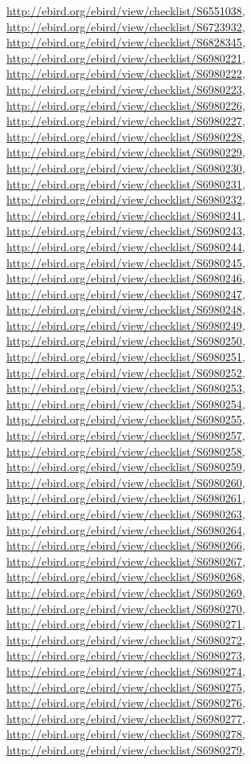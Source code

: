 \documentclass[9pt, article]{memoir}
\begin{document}
\begin{multicols}{2}
\url{http://ebird.org/ebird/view/checklist/S6551038}, 
\url{http://ebird.org/ebird/view/checklist/S6723932}, 
\url{http://ebird.org/ebird/view/checklist/S6828345}, 
\url{http://ebird.org/ebird/view/checklist/S6980221}, 
\url{http://ebird.org/ebird/view/checklist/S6980222}, 
\url{http://ebird.org/ebird/view/checklist/S6980223}, 
\url{http://ebird.org/ebird/view/checklist/S6980226}, 
\url{http://ebird.org/ebird/view/checklist/S6980227}, 
\url{http://ebird.org/ebird/view/checklist/S6980228}, 
\url{http://ebird.org/ebird/view/checklist/S6980229}, 
\url{http://ebird.org/ebird/view/checklist/S6980230}, 
\url{http://ebird.org/ebird/view/checklist/S6980231}, 
\url{http://ebird.org/ebird/view/checklist/S6980232}, 
\url{http://ebird.org/ebird/view/checklist/S6980241}, 
\url{http://ebird.org/ebird/view/checklist/S6980243}, 
\url{http://ebird.org/ebird/view/checklist/S6980244}, 
\url{http://ebird.org/ebird/view/checklist/S6980245}, 
\url{http://ebird.org/ebird/view/checklist/S6980246}, 
\url{http://ebird.org/ebird/view/checklist/S6980247}, 
\url{http://ebird.org/ebird/view/checklist/S6980248}, 
\url{http://ebird.org/ebird/view/checklist/S6980249}, 
\url{http://ebird.org/ebird/view/checklist/S6980250}, 
\url{http://ebird.org/ebird/view/checklist/S6980251}, 
\url{http://ebird.org/ebird/view/checklist/S6980252}, 
\url{http://ebird.org/ebird/view/checklist/S6980253}, 
\url{http://ebird.org/ebird/view/checklist/S6980254}, 
\url{http://ebird.org/ebird/view/checklist/S6980255}, 
\url{http://ebird.org/ebird/view/checklist/S6980257}, 
\url{http://ebird.org/ebird/view/checklist/S6980258}, 
\url{http://ebird.org/ebird/view/checklist/S6980259}, 
\url{http://ebird.org/ebird/view/checklist/S6980260}, 
\url{http://ebird.org/ebird/view/checklist/S6980261}, 
\url{http://ebird.org/ebird/view/checklist/S6980263}, 
\url{http://ebird.org/ebird/view/checklist/S6980264}, 
\url{http://ebird.org/ebird/view/checklist/S6980266}, 
\url{http://ebird.org/ebird/view/checklist/S6980267}, 
\url{http://ebird.org/ebird/view/checklist/S6980268}, 
\url{http://ebird.org/ebird/view/checklist/S6980269}, 
\url{http://ebird.org/ebird/view/checklist/S6980270}, 
\url{http://ebird.org/ebird/view/checklist/S6980271}, 
\url{http://ebird.org/ebird/view/checklist/S6980272}, 
\url{http://ebird.org/ebird/view/checklist/S6980273}, 
\url{http://ebird.org/ebird/view/checklist/S6980274}, 
\url{http://ebird.org/ebird/view/checklist/S6980275}, 
\url{http://ebird.org/ebird/view/checklist/S6980276}, 
\url{http://ebird.org/ebird/view/checklist/S6980277}, 
\url{http://ebird.org/ebird/view/checklist/S6980278}, 
\url{http://ebird.org/ebird/view/checklist/S6980279}, 

\end{multicols}
\end{document}
